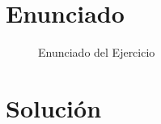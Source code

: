 \section{Enunciado}

\begin{figure}[H]
    \centering
    \caption{Enunciado del Ejercicio}
    \label{fig:pdf}
\end{figure}

\newpage
\section{Solución}


